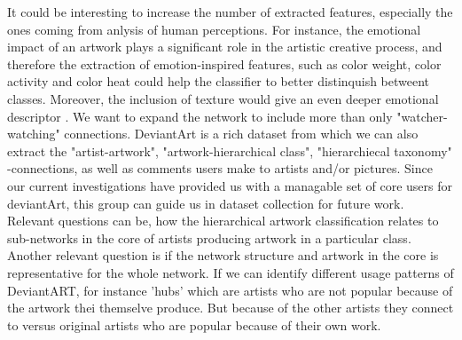
It could be interesting to increase the number of extracted features, especially the ones coming from anlysis of human perceptions.
For instance, the emotional impact of an artwork plays a significant role in the artistic creative process, and therefore the extraction of emotion-inspired features, such as color weight, color activity and color heat \cite{color_emotion1} could help the classifier to better distinquish betweent classes. Moreover, the inclusion of texture would give an even deeper emotional descriptor \cite{LucassenECCGIV2010}. 
We want to expand the network to include more than only "watcher-watching" connections. DeviantArt is a rich dataset from which we can also extract the "artist-artwork", "artwork-hierarchical class", "hierarchiecal taxonomy" -connections, as well as comments users make to artists and/or pictures. 
Since our current investigations have provided us with a managable set of core users for deviantArt, this group can guide us in dataset collection for future work. Relevant questions can be, how the hierarchical artwork classification relates to sub-networks in the core of artists producing artwork in a particular class. Another relevant question is if the network structure and artwork in the core is representative for the whole network. If we can identify different usage patterns of DeviantART, for instance 'hubs' which are artists who are not popular because of the artwork thei themselve produce. But because of the other artists they connect to versus original artists who are popular because of their own work.

 
